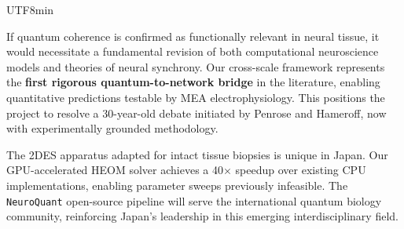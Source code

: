 \documentclass[11pt,a4paper]{article}
\newcommand{\bilabel}[2]{%
  \textbf{\textcolor{jspsNavy}{#1}}\enspace{\footnotesize\textcolor{jspsSlate}{(#2)}}%
}
\begin{document}
\begin{CJK}{UTF8}{min}
\begin{tcolorbox}[jspsSection,
  title={\faFile\enspace \bilabel{Significance and Innovation}{研究の独創性と意義} \hfill \small Section 6}]
\noindent\begin{minipage}[t]{0.48\linewidth}
  \begin{tcolorbox}[jspsField, title=Scientific Significance \small（学術的意義）]
    \small
    If quantum coherence is confirmed as functionally relevant in neural tissue, it would necessitate a fundamental revision of both computational neuroscience models and theories of neural synchrony. Our cross-scale framework represents the \textbf{first rigorous quantum-to-network bridge} in the literature, enabling quantitative predictions testable by MEA electrophysiology. This positions the project to resolve a 30-year-old debate initiated by Penrose and Hameroff, now with experimentally grounded methodology.
  \end{tcolorbox}
\end{minipage}%
\hfill
\begin{minipage}[t]{0.48\linewidth}
  \begin{tcolorbox}[jspsField, title=Technological Innovation \small（技術的独自性）]
    \small
    The 2DES apparatus adapted for intact tissue biopsies is unique in Japan. Our GPU-accelerated HEOM solver achieves a 40$\times$ speedup over existing CPU implementations, enabling parameter sweeps previously infeasible. The \texttt{NeuroQuant} open-source pipeline will serve the international quantum biology community, reinforcing Japan's leadership in this emerging interdisciplinary field.
  \end{tcolorbox}
\end{minipage}

\end{tcolorbox}

\vspace{4pt}

\begin{tcolorbox}[jspsSection,
  title={\faFile\enspace \bilabel{Expected Outcomes and Dissemination}{成果と普及}{} \hfill \small Section 7}]


\end{tcolorbox}
\end{CJK}
\end{document}
